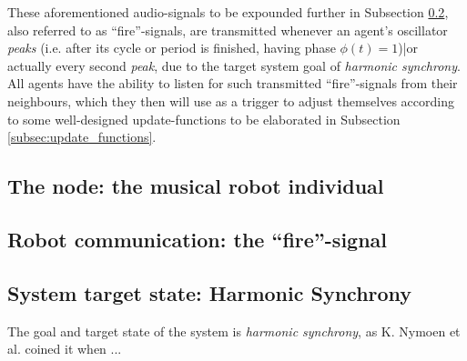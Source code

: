 	These aforementioned audio-signals to be expounded further in Subsection \ref{subsec:fire_signal}, also referred to as ``fire''-signals, are transmitted whenever an agent's oscillator \textit{peaks} (i.e. after its cycle or period is finished, having phase $\phi(t)=1$)|or actually every second \textit{peak}, due to the target system goal of \textit{harmonic synchrony}. All agents have the ability to listen for such transmitted ``fire''-signals from their neighbours, which they then will use as a trigger to adjust themselves according to some well-designed update-functions to be elaborated in Subsection \ref{subsec:update_functions}.




	\subsection{The node: the musical robot individual}
	\label{subsec:node}


	\subsection{Robot communication: the ``fire''-signal}
	\label{subsec:fire_signal}


	\subsection{System target state: Harmonic Synchrony}
	\label{subsec:harmonic_synchrony}
		The goal and target state of the system is \textit{harmonic synchrony}, as K. Nymoen et al. \cite{nymoen_synch} coined it when ...
	
